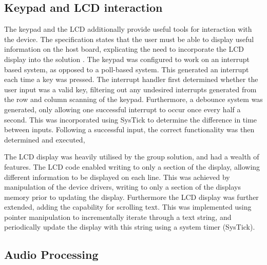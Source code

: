 \subsection*{Keypad and LCD interaction}

The keypad and the LCD additionally provide useful tools for interaction with 
the device. The specification states that the user must be able to display 
useful information on the host board, explicating the need to incorporate the 
LCD display into the solution \cite{specification}. 
The keypad was configured to work on an interrupt based system, as opposed to 
a poll-based system. This generated an interrupt each time a key was pressed. 
The interrupt handler first determined whether the user input was a valid key, 
filtering out any undesired interrupts generated from the row and column 
scanning of the keypad. 
Furthermore, a debounce system was generated, only allowing one successful 
interrupt to occur once every half a second. This was incorporated using SysTick
to determine the difference in time between inputs. 
Following a successful input, the correct functionality was then determined and 
executed, 
\par\bigskip\noindent
The LCD display was heavily utilised by the group solution, and had a wealth of 
features. 
The LCD code enabled writing to only a section of the display, allowing different 
information to be displayed on each line. 
This was achieved by manipulation of the device drivers, writing to only a 
section of the displays memory prior to updating the display. 
Furthermore the LCD display was further extended, adding the capability for 
scrolling text. 
This was implemented using pointer manipulation to incrementally iterate through 
a text string, and periodically update the display with this string using 
a system timer (SysTick).  

\subsection*{Audio Processing}

